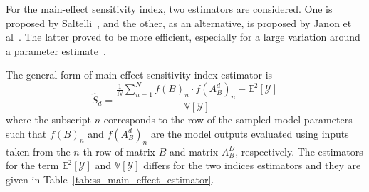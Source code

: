 

For the main-effect sensitivity index, two estimators are considered.
One is proposed by Saltelli~\cite{Saltelli2002}, and the other, as an alternative, is proposed by Janon et al~\cite{Janon2014}.
The latter proved to be more efficient, especially for a large variation around a parameter estimate~\cite{Iooss2015,Janon2014}.

The general form of main-effect sensitivity index estimator is
\begin{equation}
  \widehat{S}_d = \frac{\frac{1}{N}\sum_{n=1}^N f(B)_n \cdot f(A_B^d)_n - \mathbb{E}^2[\mathcal{Y}]}{\mathbb{V}[\mathcal{Y}]}
\label{eq:ss_main_effect_estimator}
\end{equation}
where the subscript $n$ corresponds to the row of the sampled model parameters 
such that $f(B)_n$ and $f(A^d_B)_n$ are the model outputs evaluated using inputs taken from the $n$-th row of matrix $B$ 
and matrix $A_B^D$, respectively.
The estimators for the term $\mathbb{E}^2[\mathcal{Y}]$ and $\mathbb{V}[\mathcal{Y}]$ differs for the two indices estimators and they are given in Table~\ref{tab:ss_main_effect_estimator}.

